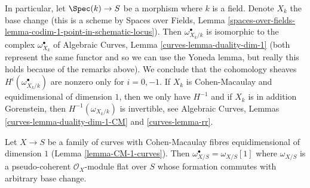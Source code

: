 \medskip\noindent
In particular, let $\Spec(k) \to S$ be a morphism where $k$ is a field.
Denote $X_k$ the base change (this is a scheme by
Spaces over Fields, Lemma
\ref{spaces-over-fields-lemma-codim-1-point-in-schematic-locus}).
Then $\omega_{X_k/k}^\bullet$ is isomorphic
to the complex $\omega_{X_k}^\bullet$ of
Algebraic Curves, Lemma \ref{curves-lemma-duality-dim-1}
(both represent the same functor and so we can use the Yoneda lemma,
but really this holds because of the remarks above).
We conclude that the cohomology sheaves
$H^i(\omega_{X_k/k}^\bullet)$
are nonzero only for $i = 0, -1$.
If $X_k$ is Cohen-Macaulay and equidimensional of dimension $1$,
then we only have $H^{-1}$ and if $X_k$ is in addition Gorenstein,
then $H^{-1}(\omega_{X_k/k})$ is invertible, see
Algebraic Curves, Lemmas \ref{curves-lemma-duality-dim-1-CM}
and \ref{curves-lemma-rr}.

\begin{lemma}
\label{lemma-CM-dualizing}
Let $X \to S$ be a family of curves with Cohen-Macaulay fibres
equidimensional of dimension $1$ (Lemma \ref{lemma-CM-1-curves}).
Then $\omega_{X/S}^\bullet = \omega_{X/S}[1]$ where $\omega_{X/S}$
is a pseudo-coherent $\mathcal{O}_X$-module flat over $S$ whose
formation commutes with arbitrary base change.
\end{lemma}

